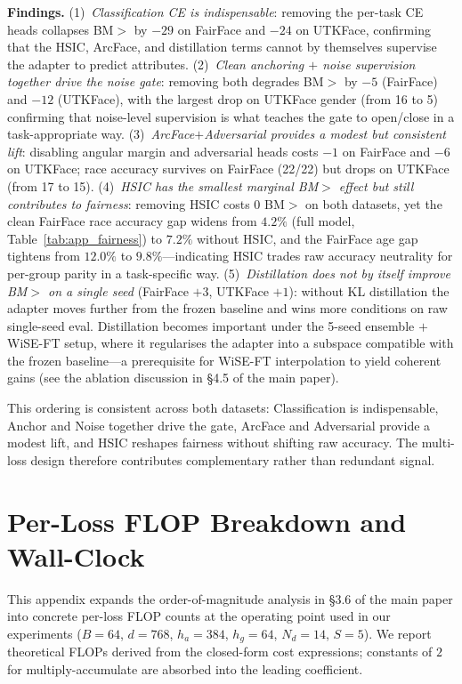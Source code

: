 \textbf{Findings.}
(1)~\textit{Classification CE is indispensable}: removing the per-task CE heads collapses BM$>$ by $-29$ on FairFace and $-24$ on UTKFace, confirming that the HSIC, ArcFace, and distillation terms cannot by themselves supervise the adapter to predict attributes.
(2)~\textit{Clean anchoring $+$ noise supervision together drive the noise gate}: removing both degrades BM$>$ by $-5$ (FairFace) and $-12$ (UTKFace), with the largest drop on UTKFace gender (from 16 to 5) confirming that noise-level supervision is what teaches the gate to open/close in a task-appropriate way.
(3)~\textit{ArcFace$+$Adversarial provides a modest but consistent lift}: disabling angular margin and adversarial heads costs $-1$ on FairFace and $-6$ on UTKFace; race accuracy survives on FairFace (22/22) but drops on UTKFace (from 17 to 15).
(4)~\textit{HSIC has the smallest marginal BM$>$ effect but still contributes to fairness}: removing HSIC costs $0$ BM$>$ on both datasets, yet the clean FairFace race accuracy gap widens from $4.2\%$ (full model, Table~\ref{tab:app_fairness}) to $7.2\%$ without HSIC, and the FairFace age gap tightens from $12.0\%$ to $9.8\%$---indicating HSIC trades raw accuracy neutrality for per-group parity in a task-specific way.
(5)~\textit{Distillation does not by itself improve BM$>$ on a single seed} (FairFace $+3$, UTKFace $+1$): without KL distillation the adapter moves further from the frozen baseline and wins more conditions on raw single-seed eval.
Distillation becomes important under the 5-seed ensemble $+$ WiSE-FT setup, where it regularises the adapter into a subspace compatible with the frozen baseline---a prerequisite for WiSE-FT interpolation to yield coherent gains (see the ablation discussion in \S4.5 of the main paper).

This ordering is consistent across both datasets: Classification is indispensable, Anchor and Noise together drive the gate, ArcFace and Adversarial provide a modest lift, and HSIC reshapes fairness without shifting raw accuracy.
The multi-loss design therefore contributes complementary rather than redundant signal.


\section{Per-Loss FLOP Breakdown and Wall-Clock}
\label{app:cost}

This appendix expands the order-of-magnitude analysis in \S3.6 of the main paper into concrete per-loss FLOP counts at the operating point used in our experiments ($B{=}64$, $d{=}768$, $h_a{=}384$, $h_g{=}64$, $N_d{=}14$, $S{=}5$).
We report theoretical FLOPs derived from the closed-form cost expressions; constants of $2$ for multiply-accumulate are absorbed into the leading coefficient.


